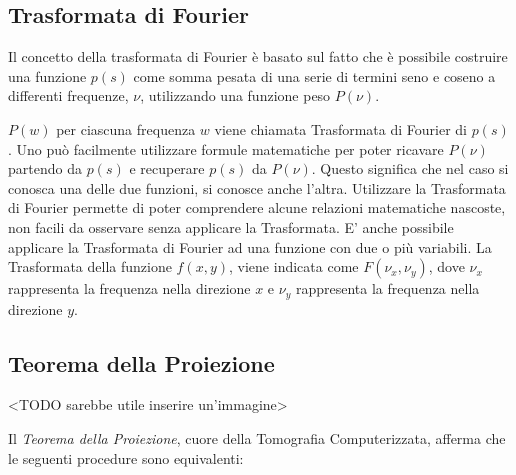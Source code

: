 \documentclass[a4paper,12pt, doubleside]{report}
\begin{document}
                \bigskip
                               
            \subsection{Trasformata di Fourier}
                \par
                    Il concetto della trasformata di Fourier è basato sul fatto che è possibile costruire una funzione $p(s)$ come somma pesata di una serie di termini seno e coseno a differenti frequenze, $\nu$, utilizzando una funzione peso $P(\nu)$.
                
                \bigskip
                \par
                    $P(w)$ per ciascuna frequenza $w$ viene chiamata Trasformata di Fourier di $p(s)$. Uno può facilmente utilizzare formule matematiche per poter ricavare $P(\nu)$ partendo da $p(s)$ e recuperare $p(s)$ da $P(\nu)$. Questo significa che nel caso si conosca una delle due funzioni, si conosce anche l'altra. Utilizzare la Trasformata di Fourier permette di poter comprendere alcune relazioni matematiche nascoste, non facili da osservare senza applicare la Trasformata. E' anche possibile applicare la Trasformata di Fourier ad una funzione con due o più variabili. La Trasformata della funzione $f(x,y)$, viene indicata come $F(\nu_x,\nu_y)$, dove $\nu_x$ rappresenta la frequenza nella direzione $x$ e $\nu_y$ rappresenta la frequenza nella direzione $y$.
                    
            \subsection{Teorema della Proiezione}
                <TODO sarebbe utile inserire un'immagine>
                \par
                    Il \textit{Teorema della Proiezione}, cuore della Tomografia Computerizzata, afferma che le seguenti procedure sono equivalenti:
        
\end{document}
